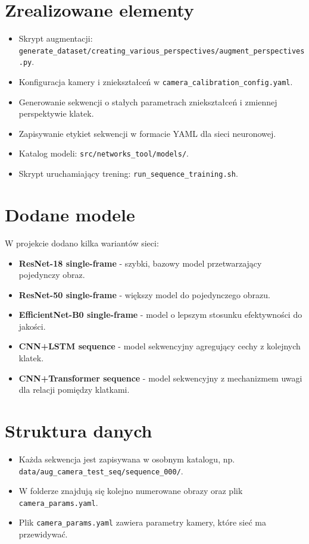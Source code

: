 \documentclass[11pt,a4paper]{article}
\begin{document}
\section{Zrealizowane elementy}
\begin{itemize}[leftmargin=*]
    \item Skrypt augmentacji: \texttt{generate_dataset/creating_various_perspectives/augment_perspectives.py}.
    \item Konfiguracja kamery i zniekształceń w \texttt{camera_calibration_config.yaml}.
    \item Generowanie sekwencji o stałych parametrach zniekształceń i zmiennej perspektywie klatek.
    \item Zapisywanie etykiet sekwencji w formacie YAML dla sieci neuronowej.
    \item Katalog modeli: \texttt{src/networks_tool/models/}.
    \item Skrypt uruchamiający trening: \texttt{run_sequence_training.sh}.
\end{itemize}

\section{Dodane modele}
W projekcie dodano kilka wariantów sieci:
\begin{itemize}[leftmargin=*]
    \item \textbf{ResNet-18 single-frame} - szybki, bazowy model przetwarzający pojedynczy obraz.
    \item \textbf{ResNet-50 single-frame} - większy model do pojedynczego obrazu.
    \item \textbf{EfficientNet-B0 single-frame} - model o lepszym stosunku efektywności do jakości.
    \item \textbf{CNN+LSTM sequence} - model sekwencyjny agregujący cechy z kolejnych klatek.
    \item \textbf{CNN+Transformer sequence} - model sekwencyjny z mechanizmem uwagi dla relacji pomiędzy klatkami.
\end{itemize}

\section{Struktura danych}
\begin{itemize}[leftmargin=*]
    \item Każda sekwencja jest zapisywana w osobnym katalogu, np. \texttt{data/aug_camera_test_seq/sequence_000/}.
    \item W folderze znajdują się kolejno numerowane obrazy oraz plik \texttt{camera_params.yaml}.
    \item Plik \texttt{camera_params.yaml} zawiera parametry kamery, które sieć ma przewidywać.
\end{itemize}
\end{document}
